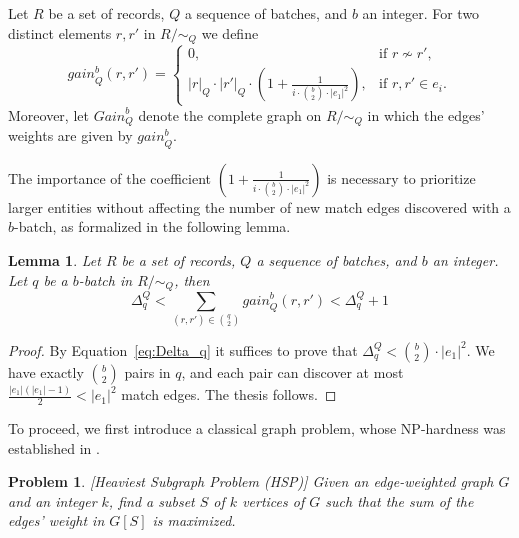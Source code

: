 \documentclass[sigconf, nonacm]{acmart}
\newcommand{\gain}{\textit{gain}\xspace}
\newtheorem{lemma}{Lemma}[section]
\newtheorem{problem}{Problem}
\begin{document}

\begin{definition}\label{def:gain}
    Let $R$ be a set of records, $Q$ a sequence of batches, and $b$ an integer. For two distinct elements $r,r'$ in $R/\sim_Q$ we define
\begin{equation}\label{eq:gain}
    \gain^b_Q(r,r') =
    \begin{cases}
        0, & \text{if } r\not\sim r',\\
        |r|_Q\cdot |r'|_Q \cdot (1+\frac{1}{i\cdot \binom{b}{2}\cdot|e_1|^2}), &\text{if $r,r'\in e_i$.}
    \end{cases}
\end{equation}
Moreover, let $\textit{Gain}^b_Q$ denote the complete graph on $R/\sim_Q$ in which the edges' weights are given by $\gain^b_Q$.
\end{definition}

The importance of the coefficient $(1+\frac{1}{i\cdot \binom{b}{2}\cdot|e_1|^2})$ is necessary to prioritize larger entities without affecting the number of new match edges discovered with a $b$-batch, as formalized in the following lemma.

\begin{lemma}\label{lemma:gain}
Let $R$ be a set of records, $Q$ a sequence of batches, and $b$ an integer. Let $q$ be a $b$-batch in $R/\sim_Q$, then
\begin{equation}\Delta^Q_q  < \sum_{(r,r')\in \binom{q}{2}} \gain^b_Q(r,r') < \Delta^Q_q  + 1
\end{equation}
\end{lemma}
\begin{proof}
    By Equation~\ref{eq:Delta_q} it suffices to prove that $\Delta^Q_q  < \binom{b}{2}\cdot|e_1|^2$. We have exactly $\binom{b}{2}$ pairs in $q$, and each pair can discover at most $\frac{|e_1|(|e_1|-1)}{2} < |e_1|^2$ match edges. The thesis follows.
\end{proof}

To proceed, we first introduce a classical graph problem, whose NP-hardness was established in \cite{Feige2001}.

\begin{problem}\label{prob:k-heaviest}[Heaviest Subgraph Problem (HSP)]
    Given an edge-weighted graph $G$ and an integer $k$, find a subset $S$ of $k$ vertices of $G$ such that the sum of the edges' weight in $G[S]$ is maximized. 
\end{problem}
\end{document}
